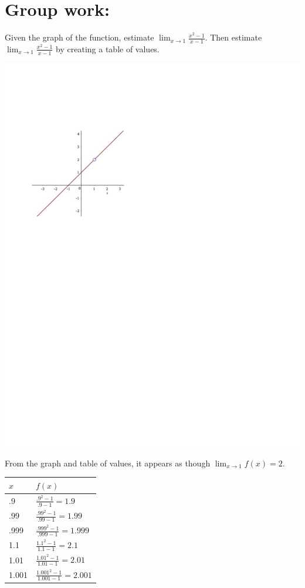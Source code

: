 \documentclass[nooutcomes]{ximera}
\begin{document}
\section*{Group work:}
	
\begin{problem}
Given the graph of the function, estimate $\lim_{x \to 1} \frac{x^2 - 1}{x - 1} $.  Then estimate $\lim_{x \to 1} \frac{x^2 - 1}{x - 1} $ by creating a table of values.
	
	\begin{image}
	\includegraphics[trim= 50 470 300 135]{Figure1.pdf}
	\end{image}
	
	\begin{freeResponse}
	From the graph and table of values, it appears as though $\lim_{x \to 1} f(x) = 2$.
	
	\begin{tabular}{|l|l|}
	\hline
	\hspace{2mm} $x$ & \hspace{4mm} $f(x)$  \\
	\hline
	.9 & $ \frac{{{.9}^{2}}-1}{.9-1}=1.9  $  \\
	\hline
	.99 & $ \frac{{{.99}^{2}}-1}{.99-1}=1.99 $  \\
	\hline
	.999 & $ \frac{{{.999}^{2}}-1}{.999-1}=1.999 $  \\
	\hline
	1.1 & $ \frac{{{1.1}^{2}}-1}{1.1-1}=2.1 $  \\
	\hline
	1.01 & $ \frac{{{1.01}^{2}}-1}{1.01-1}=2.01 $  \\
	\hline
	1.001 & $ \frac{{{1.001}^{2}}-1}{1.001-1}=2.001 $  \\
	\hline
	\end{tabular}
	

\end{freeResponse}
\end{problem}
\end{document}
